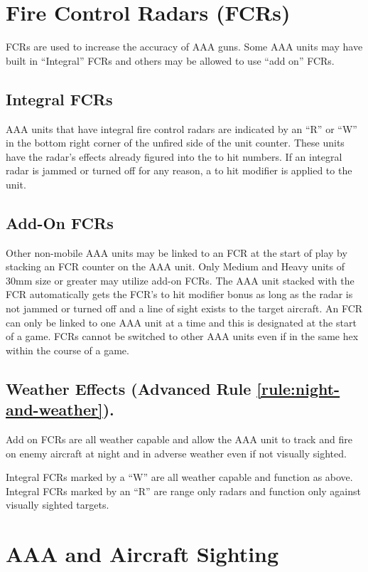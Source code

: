 \section{Fire Control Radars (FCRs)}

FCRs are used to increase the accuracy of AAA guns. Some AAA units may have built in “Integral” FCRs and others may be allowed to use “add on” FCRs.

\subsection{Integral FCRs} AAA units that have integral fire control radars are indicated by an “R” or “W” in the bottom right corner of the unfired side of the unit counter. These units have the radar's effects already figured into the to hit numbers. If an integral radar is jammed or turned off for any reason, a  to hit modifier is applied to the unit.

\subsection{Add-On FCRs} Other non-mobile AAA units may be linked to an FCR at the start of play by stacking an FCR counter on the AAA unit. Only Medium and Heavy units of 30mm size or greater may utilize add-on FCRs. The AAA unit stacked with the FCR automatically gets the FCR's to hit modifier bonus as long as the radar is not jammed or turned off and a line of sight exists to the target aircraft. An FCR can only be linked to one AAA unit at a time and this is designated at the start of a game. FCRs cannot be switched to other AAA units even if in the same hex within the course of a game.

\subsection{Weather Effects (Advanced Rule \ref{rule:night-and-weather}).} Add on FCRs are all weather capable and allow the AAA unit to track and fire on enemy aircraft at night and in adverse weather even if not visually sighted.

Integral FCRs marked by a “W” are all weather capable and function as above. Integral FCRs marked by an “R” are range only radars and function only against visually sighted targets.

\section{AAA and Aircraft Sighting}
\label{rule:aaa-and-aircraft-sighting}

